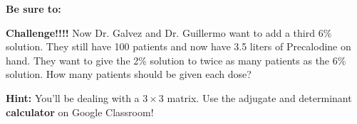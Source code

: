 \documentclass{exam}
\begin{document}
\begin{questions}
\textbf{Be sure to:}

\question \textbf{Challenge!!!!} Now Dr. Galvez and Dr. Guillermo want to add a third 6\% solution.  They still have 100 patients and now have 3.5 liters of Precalodine on hand. They want to give the 2\% solution to twice as many patients as the 6\% solution. How many patients should be given each dose?

  \textbf{Hint: }  You'll be dealing with a $3\times 3$ matrix. Use the adjugate and determinant \textbf{calculator} on Google Classroom!

\end{questions}
\end{document}
